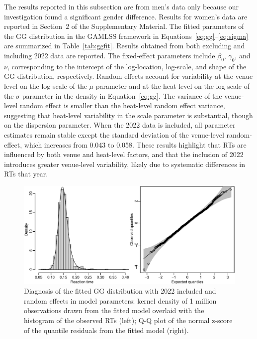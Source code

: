 \documentclass[12pt, letterpaper]{article}
\begin{document}
The results reported in this subsection are from men's data only
because our investigation found a significant gender difference.
Results for women's data are reported in Section~2 of the
Supplementary Material. The fitted parameters of the GG distribution in the
GAMLSS framework in Equations~\eqref{eq:gg}--\eqref{eq:sigma} are
summarized in Table~\ref{tab:ggfit}. Results obtained from both
excluding and including 2022 data are reported. The fixed-effect
parameters include $\beta_0$, $\gamma_0$, and $\nu$, corresponding to
the intercept of the log-location, log-scale, and shape of the GG
distribution, respectively. Random effects account for variability at
the venue level on the log-scale of the $\mu$ parameter
and at the heat level on the log-scale of the $\sigma$
parameter in the density in Equation~\eqref{eq:gg}. The variance
of the venue-level random effect is smaller than the heat-level random
effect variance, suggesting that heat-level variability in the scale
parameter is substantial, though on the dispersion parameter. When the
2022 data is included, all parameter estimates remain stable except
the standard deviation of the venue-level random-effect,
which increases from 0.043 to 0.058. These results
highlight that RTs are influenced by both venue and heat-level
factors, and that the inclusion of 2022 introduces greater venue-level
variability, likely due to systematic differences in RTs that year.


\begin{figure}[tbp]
  \centering
  \includegraphics[width=\textwidth]{diagnosis.pdf}
  \caption{Diagnosis of the fitted GG distribution with 2022 included and
    random effects in model parameters: kernel density of 1 million
    observations drawn from the fitted model overlaid with the
    histogram of the observed RTs (left); Q-Q plot of the
    normal z-score of the quantile residuals from the fitted model (right).}
  \label{fig:diagnosis}
\end{figure}
\end{document}
